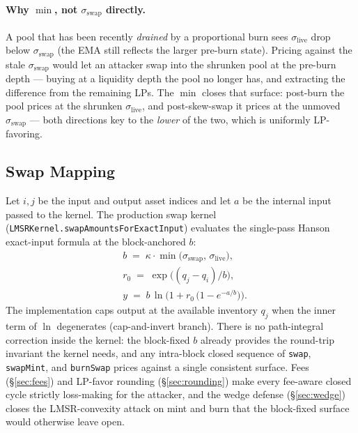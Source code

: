 \documentclass[11pt]{article}
\begin{document}
\paragraph{Why $\min$, not $\sigma_{\mathrm{swap}}$ directly.}
A pool that has been recently \emph{drained} by a proportional burn
sees $\sigma_{\mathrm{live}}$ drop below $\sigma_{\mathrm{swap}}$ (the
EMA still reflects the larger pre-burn state). Pricing against the
stale $\sigma_{\mathrm{swap}}$ would let an attacker swap into the
shrunken pool at the pre-burn depth --- buying at a liquidity depth the
pool no longer has, and extracting the difference from the remaining
LPs. The $\min$ closes that surface: post-burn the pool prices at the shrunken
$\sigma_{\mathrm{live}}$, and post-skew-swap it prices at the unmoved
$\sigma_{\mathrm{swap}}$ --- both directions key to the \emph{lower} of
the two, which is uniformly LP-favoring.

\subsection{Swap Mapping}
\label{sec:swap-mapping}

Let $i, j$ be the input and output asset indices and let $a$ be the
internal input passed to the kernel. The production swap kernel
(\texttt{LMSRKernel.\allowbreak swapAmountsForExactInput}) evaluates the
single-pass Hanson exact-input formula at the block-anchored $b$:
\begin{align}
  &b \;=\; \kappa \cdot \min\!\big(\sigma_{\mathrm{swap}},\,\sigma_{\mathrm{live}}\big), \nonumber\\
  &r_0 \;=\; \exp\!\big((q_j - q_i)/b\big), \nonumber\\
  &y \;=\; b\,\ln\!\Big(1 + r_0\,\big(1 - e^{-a/b}\big)\Big).
\end{align}
The implementation caps output at the available inventory $q_j$ when
the inner term of $\ln$ degenerates (cap-and-invert branch). There is
no path-integral correction inside the kernel: the block-fixed $b$
already provides the round-trip invariant the kernel needs, and any
intra-block closed sequence of \texttt{swap}, \texttt{swapMint}, and
\texttt{burnSwap} prices against a single consistent surface. Fees
(\S\ref{sec:fees}) and LP-favor rounding (\S\ref{sec:rounding}) make
every fee-aware closed cycle strictly loss-making for the attacker, and
the wedge defense (\S\ref{sec:wedge}) closes the
LMSR-convexity attack on mint and burn that the block-fixed surface
would otherwise leave open.
\end{document}
